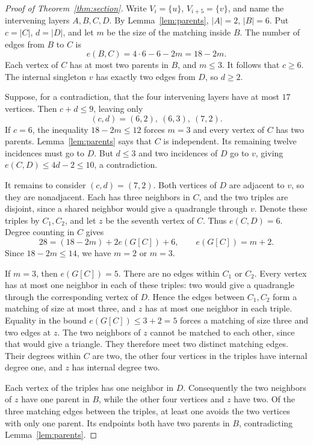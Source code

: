 \documentclass[11pt]{article}
\begin{document}
\begin{proof}[Proof of Theorem~\ref{thm:section}]
Write $V_i=\{u\}$, $V_{i+5}=\{v\}$, and name the intervening layers
$A,B,C,D$. By Lemma~\ref{lem:parents}, $|A|=2$, $|B|=6$. Put
$c=|C|$, $d=|D|$, and let $m$ be the size of the matching inside $B$.
The number of edges from $B$ to $C$ is
\[
 e(B,C)=4\cdot6-6-2m=18-2m.
\]
Each vertex of $C$ has at most two parents in $B$, and $m\leq3$.
It follows that $c\geq6$. The internal singleton $v$ has exactly two
edges from $D$, so $d\geq2$.

Suppose, for a contradiction, that the four intervening layers have
at most $17$ vertices. Then $c+d\leq9$, leaving only
\[
 (c,d)=(6,2),\ (6,3),\ (7,2).
\]
If $c=6$, the inequality $18-2m\leq12$ forces $m=3$ and every vertex
of $C$ has two parents. Lemma~\ref{lem:parents} says that $C$ is
independent. Its remaining twelve incidences must go to $D$.
But $d\leq3$ and two incidences of $D$ go to $v$, giving
$e(C,D)\leq4d-2\leq10$, a contradiction.

It remains to consider $(c,d)=(7,2)$. Both vertices of $D$ are adjacent
to $v$, so they are nonadjacent. Each has three neighbors in $C$,
and the two triples are disjoint, since a shared neighbor would give
a quadrangle through $v$. Denote these triples by $C_1,C_2$, and let
$z$ be the seventh vertex of $C$. Thus $e(C,D)=6$.
Degree counting in $C$ gives
\[
 28=(18-2m)+2e(G[C])+6,
 \qquad e(G[C])=m+2.
\]
Since $18-2m\leq14$, we have $m=2$ or $m=3$.

If $m=3$, then $e(G[C])=5$. There are no edges within $C_1$ or $C_2$.
Every vertex has at most one neighbor in each of these triples: two
would give a quadrangle through the corresponding vertex of $D$.
Hence the edges between $C_1,C_2$ form a matching of size at most three,
and $z$ has at most one neighbor in each triple. Equality in the bound
$e(G[C])\leq3+2=5$ forces a matching of size three and two edges at $z$.
The two neighbors of $z$ cannot be matched to each other, since that
would give a triangle. They therefore meet two distinct matching edges.
Their degrees within $C$ are two, the other four vertices in the triples
have internal degree one, and $z$ has internal degree two.

Each vertex of the triples has one neighbor in $D$. Consequently the
two neighbors of $z$ have one parent in $B$, while the other four
vertices and $z$ have two. Of the three matching edges between the
triples, at least one avoids the two vertices with only one parent.
Its endpoints both have two parents in $B$, contradicting
Lemma~\ref{lem:parents}.


\end{proof}
\end{document}
